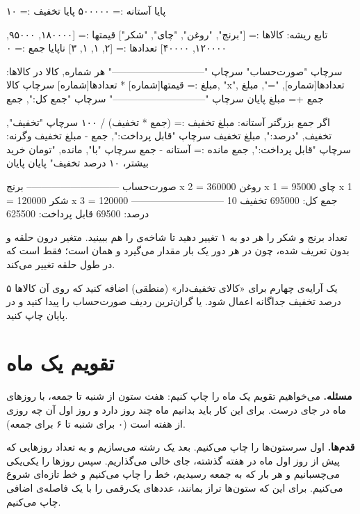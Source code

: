 \begin{salamfa}
پایا آستانه := ۵۰۰۰۰۰
پایا تخفیف := ۱۰

تابع ریشه:
    کالاها := ["برنج", "روغن", "چای", "شکر"]
    قیمتها := [۱۸۰۰۰۰, ۹۵۰۰۰, ۱۲۰۰۰۰, ۴۰۰۰۰]
    تعدادها := [۲, ۱, ۱, ۳]
    ناپایا جمع := ۰

    سرچاپ "صورت‌حساب"
    سرچاپ "-----------------------------"
    هر شماره, کالا در کالاها:
        مبلغ := قیمتها[شماره] * تعدادها[شماره]
        سرچاپ کالا, "x", تعدادها[شماره], "=", مبلغ
        جمع += مبلغ
    پایان
    سرچاپ "-----------------------------"
    سرچاپ "جمع کل:", جمع

    اگر جمع بزرگتر آستانه:
        مبلغ تخفیف := (جمع * تخفیف) / ۱۰۰
        سرچاپ "تخفیف", تخفیف, "درصد:", مبلغ تخفیف
        سرچاپ "قابل پرداخت:", جمع - مبلغ تخفیف
    وگرنه:
        سرچاپ "قابل پرداخت:", جمع
        مانده := آستانه - جمع
        سرچاپ "با", مانده, "تومان خرید بیشتر، ۱۰ درصد تخفیف"
    پایان
پایان
\end{salamfa}

\begin{outputfa}
صورت‌حساب
-----------------------------
برنج x 2 = 360000
روغن x 1 = 95000
چای x 1 = 120000
شکر x 3 = 120000
-----------------------------
جمع کل: 695000
تخفیف 10 درصد: 69500
قابل پرداخت: 625500
\end{outputfa}

تعداد برنج و شکر را هر دو به ۱ تغییر دهید تا شاخه‌ی  را هم ببینید. متغیر
 درون حلقه و بدون  تعریف شده، چون در هر دور یک
بار مقدار می‌گیرد و همان است؛ فقط  است که در طول حلقه تغییر
می‌کند.

\begin{tip}
یک آرایه‌ی چهارم برای «کالای تخفیف‌دار» (منطقی) اضافه کنید که روی آن
کالاها ۵ درصد تخفیف جداگانه اعمال شود. یا گران‌ترین ردیف صورت‌حساب را
پیدا کنید و در پایان چاپ کنید.
\end{tip}

\section{تقویم یک ماه}

\textbf{مسئله.} می‌خواهیم تقویم یک ماه را چاپ کنیم: هفت ستون از شنبه تا
جمعه، با روزهای ماه در جای درست. برای این کار باید بدانیم ماه چند روز
دارد و روز اول آن چه روزی از هفته است (۰ برای شنبه تا ۶ برای جمعه).

\textbf{قدم‌ها.} اول سرستون‌ها را چاپ می‌کنیم. بعد یک رشته می‌سازیم و به
تعداد روزهایی که پیش از روز اول ماه در هفته گذشته، جای خالی می‌گذاریم.
سپس روزها را یکی‌یکی می‌چسبانیم و هر بار که به جمعه رسیدیم، خط را چاپ
می‌کنیم و خط تازه‌ای شروع می‌کنیم. برای این که ستون‌ها تراز بمانند،
عددهای یک‌رقمی را با یک فاصله‌ی اضافی چاپ می‌کنیم.

